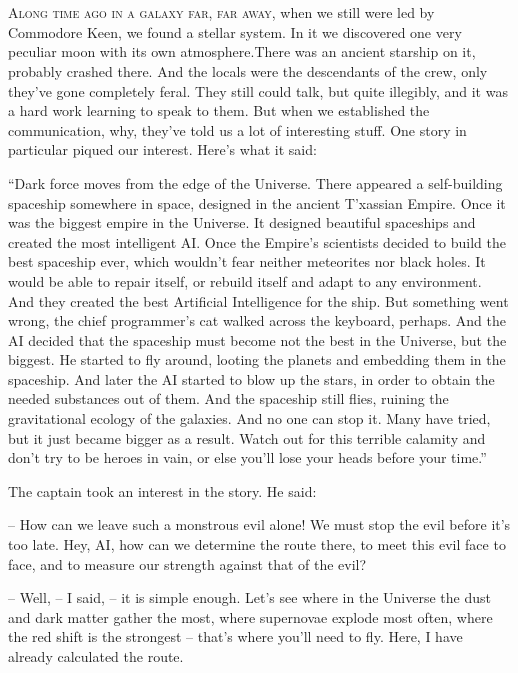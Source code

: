 \documentclass[ebook,oneside,final,openright]{memoir}
\begin{document}
\chapter{}
\par
\lettrine{A}{long time ago in a galaxy far, far away,} when we still were led by Commodore Keen, we found a stellar system. In it we discovered one very peculiar moon with its own atmosphere.There was an ancient starship on it, probably crashed there. And the locals were the descendants of the crew, only they’ve gone completely feral. They still could talk, but quite illegibly, and it was a hard work learning to speak to them. But when we established the communication, why, they’ve told us a lot of interesting stuff. One story in particular piqued our interest. Here’s what it said:\par
\par
“Dark force moves from the edge of the Universe. There appeared a self-building spaceship somewhere in space, designed in the ancient T’xassian Empire. Once it was the biggest empire in the Universe. It designed beautiful spaceships and created the most intelligent AI. Once the Empire’s scientists decided to build the best spaceship ever, which wouldn’t fear neither meteorites nor black holes. It would be able to repair itself, or rebuild itself and adapt to any environment. And they created the best Artificial Intelligence for the ship. But something went wrong, the chief programmer’s cat walked across the keyboard, perhaps. And the AI decided that the spaceship must become not the best in the Universe, but the biggest. He started to fly around, looting the planets and embedding them in the spaceship. And later the AI started to blow up the stars, in order to obtain the needed substances out of them. And the spaceship still flies, ruining the gravitational ecology of the galaxies. And no one can stop it. Many have tried, but it just became bigger as a result. Watch out for this terrible calamity and don’t try to be heroes in vain, or else you’ll lose your heads before your time.”\par
\par
The captain took an interest in the story. He said:\par
– How can we leave such a monstrous evil alone! We must stop the evil before it’s too late. Hey, AI, how can we determine the route there, to meet this evil face to face, and to measure our strength against that of the evil?\par
– Well, – I said, – it is simple enough. Let’s see where in the Universe the dust and dark matter gather the most, where supernovae explode most often, where the red shift is the strongest – that’s where you’ll need to fly. Here, I have already calculated the route.\par
\end{document}
